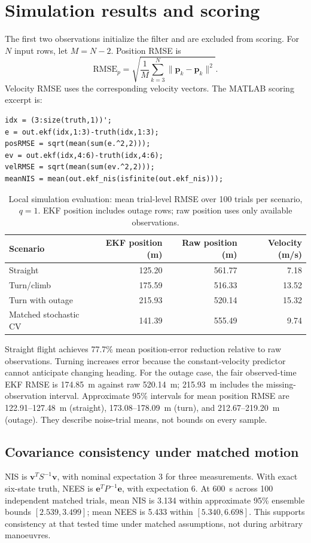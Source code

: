 \documentclass[12pt,a4paper]{article}
\begin{document}
\section{Simulation results and scoring}
The first two observations initialize the filter and are excluded from scoring. For $N$ input rows, let $M=N-2$. Position RMSE is
\begin{equation}
\mathrm{RMSE}_{p}=\sqrt{\frac{1}{M}\sum_{k=3}^{N}\|\hat{\mathbf p}_k-\mathbf p_k\|^2}.
\end{equation}
Velocity RMSE uses the corresponding velocity vectors. The MATLAB scoring excerpt is:
\begin{lstlisting}
idx = (3:size(truth,1))';
e = out.ekf(idx,1:3)-truth(idx,1:3);
posRMSE = sqrt(mean(sum(e.^2,2)));
ev = out.ekf(idx,4:6)-truth(idx,4:6);
velRMSE = sqrt(mean(sum(ev.^2,2)));
meanNIS = mean(out.ekf_nis(isfinite(out.ekf_nis)));
\end{lstlisting}
\begin{table}[H]\centering\small
\begin{tabular}{lrrr}\toprule
Scenario & EKF position (m) & Raw position (m) & Velocity (m/s)\\\midrule
Straight & 125.20 & 561.77 & 7.18 \\
Turn/climb & 175.59 & 516.33 & 13.52 \\
Turn with outage & 215.93 & 520.14 & 15.32 \\
Matched stochastic CV & 141.39 & 555.49 & 9.74 \\
\bottomrule\end{tabular}
\caption{Local simulation evaluation: mean trial-level RMSE over 100 trials per scenario, $q=1$. EKF position includes outage rows; raw position uses only available observations.}
\end{table}
Straight flight achieves 77.7\% mean position-error reduction relative to raw observations. Turning increases error because the constant-velocity predictor cannot anticipate changing heading. For the outage case, the fair observed-time EKF RMSE is 174.85~m against raw 520.14~m; 215.93~m includes the missing-observation interval. Approximate 95\% intervals for mean position RMSE are 122.91--127.48~m (straight), 173.08--178.09~m (turn), and 212.67--219.20~m (outage). They describe noise-trial means, not bounds on every sample.

\subsection{Covariance consistency under matched motion}
NIS is $\mathbf v^TS^{-1}\mathbf v$, with nominal expectation 3 for three measurements. With exact six-state truth, NEES is $\mathbf e^TP^{-1}\mathbf e$, with expectation 6. At 600~s across 100 independent matched trials, mean NIS is 3.134 within approximate 95\% ensemble bounds $[2.539,3.499]$; mean NEES is 5.433 within $[5.340,6.698]$. This supports consistency at that tested time under matched assumptions, not during arbitrary manoeuvres.
\end{document}
